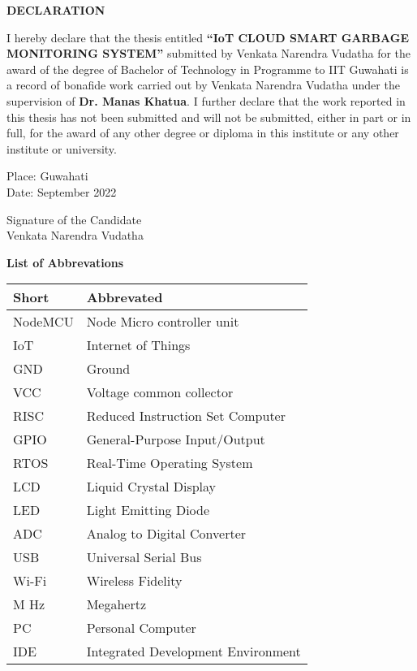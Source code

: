 \documentclass[12pt,letterpaper]{article}
\begin{document}
\newpage
\begin{center}
    \large{\textbf{DECLARATION}}
\end{center}
I hereby declare that the thesis entitled \textbf{“IoT CLOUD SMART GARBAGE MONITORING SYSTEM”} submitted by Venkata Narendra Vudatha for the award of the degree of Bachelor of Technology in Programme to IIT Guwahati is a record of bonafide work carried out by Venkata Narendra Vudatha under the supervision of \textbf{Dr. Manas Khatua}. I further declare that the work reported in this thesis has not been 
submitted and will not be submitted, either in part or in full, for the award of any other degree or diploma in this institute or any other institute or university. \\
\begin{flushleft}
Place: Guwahati\\
Date: September 2022 \\
\end{flushleft}
\begin{flushright}
Signature of the Candidate \\
Venkata Narendra Vudatha\\
\end{flushright}



\newpage
\begin{center}
    \large{\textbf{List of Abbrevations}}\\
    \vspace{0.2 in}
    \begin{tabular}{ |p{3cm}|p{6cm}|  }
    \hline
    Short & Abbrevated\\
    \hline
     NodeMCU   & Node Micro controller unit\\
     IoT   & Internet of Things\\
     GND   & Ground\\
     VCC   & Voltage common collector\\
     RISC   & Reduced Instruction Set Computer\\
     GPIO   & General-Purpose Input/Output\\
     RTOS   & Real-Time Operating System\\
     LCD   & Liquid Crystal Display\\
     LED   & Light Emitting Diode\\
     ADC   & Analog to Digital Converter\\
     USB   & Universal Serial Bus\\
     Wi-Fi   & Wireless Fidelity\\
     M Hz   & Megahertz\\
     PC   & Personal Computer\\
     IDE   & Integrated Development Environment\\
     \hline
    \end{tabular}
\end{center}
\end{document}
